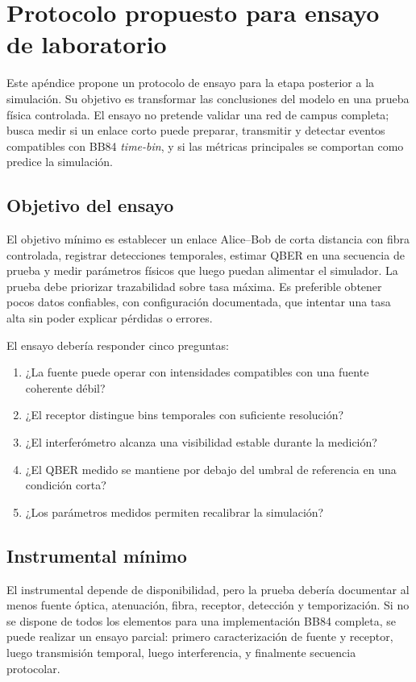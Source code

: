 \chapter{Protocolo propuesto para ensayo de laboratorio}
\label{app:ensayo_laboratorio}

Este apéndice propone un protocolo de ensayo para la etapa posterior a la simulación. Su objetivo es transformar las conclusiones del modelo en una prueba física controlada. El ensayo no pretende validar una red de campus completa; busca medir si un enlace corto puede preparar, transmitir y detectar eventos compatibles con BB84 \textit{time-bin}, y si las métricas principales se comportan como predice la simulación.

\section{Objetivo del ensayo}

El objetivo mínimo es establecer un enlace Alice--Bob de corta distancia con fibra controlada, registrar detecciones temporales, estimar QBER en una secuencia de prueba y medir parámetros físicos que luego puedan alimentar el simulador. La prueba debe priorizar trazabilidad sobre tasa máxima. Es preferible obtener pocos datos confiables, con configuración documentada, que intentar una tasa alta sin poder explicar pérdidas o errores.

El ensayo debería responder cinco preguntas:

\begin{enumerate}
  \item ¿La fuente puede operar con intensidades compatibles con una fuente coherente débil?
  \item ¿El receptor distingue bins temporales con suficiente resolución?
  \item ¿El interferómetro alcanza una visibilidad estable durante la medición?
  \item ¿El QBER medido se mantiene por debajo del umbral de referencia en una condición corta?
  \item ¿Los parámetros medidos permiten recalibrar la simulación?
\end{enumerate}

\section{Instrumental mínimo}

El instrumental depende de disponibilidad, pero la prueba debería documentar al menos fuente óptica, atenuación, fibra, receptor, detección y temporización. Si no se dispone de todos los elementos para una implementación BB84 completa, se puede realizar un ensayo parcial: primero caracterización de fuente y receptor, luego transmisión temporal, luego interferencia, y finalmente secuencia protocolar.

